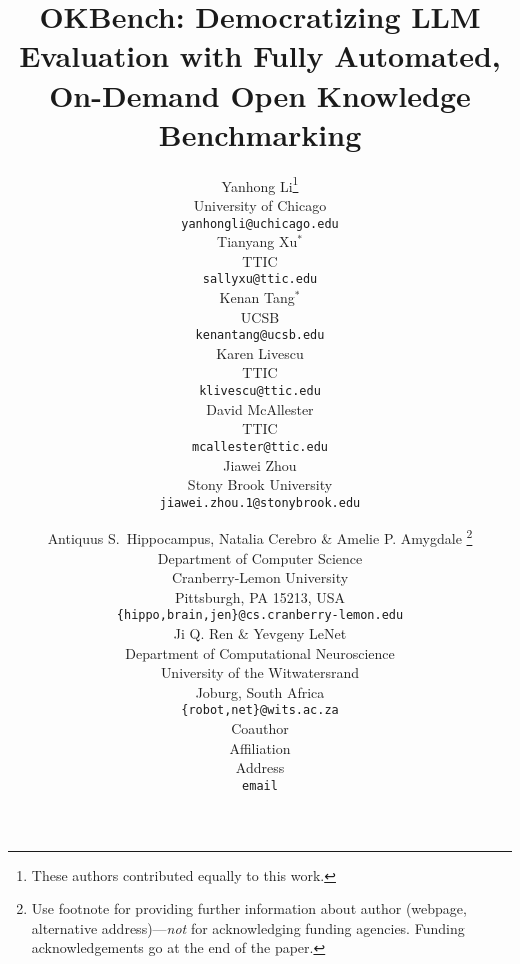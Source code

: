 \documentclass[11pt]{article}
\title{OKBench: Democratizing LLM Evaluation with Fully Automated, On-Demand Open Knowledge Benchmarking}
\author{Yanhong Li\thanks{These authors contributed equally to this work.} \\
  University of Chicago \\
  \texttt{yanhongli@uchicago.edu}\\\And
  Tianyang Xu$^{*}$ \\
  TTIC \\
  \texttt{sallyxu@ttic.edu} \\\And
  Kenan Tang$^{*}$ \\
  UCSB \\
  \texttt{kenantang@ucsb.edu} \\
  \AND
  Karen Livescu \\
  TTIC \\
  \texttt{klivescu@ttic.edu} \\
  \And
  David McAllester \\
  TTIC \\
\texttt{mcallester@ttic.edu} \\
  \And
  Jiawei Zhou \\
  Stony Brook University \\
\texttt{jiawei.zhou.1@stonybrook.edu}
  }
\begin{document}
\maketitle




\author{Antiquus S.~Hippocampus, Natalia Cerebro \& Amelie P. Amygdale \thanks{ Use footnote for providing further information
about author (webpage, alternative address)---\emph{not} for acknowledging
funding agencies.  Funding acknowledgements go at the end of the paper.} \\
Department of Computer Science\\
Cranberry-Lemon University\\
Pittsburgh, PA 15213, USA \\
\texttt{\{hippo,brain,jen\}@cs.cranberry-lemon.edu} \\
\And
Ji Q. Ren \& Yevgeny LeNet \\
Department of Computational Neuroscience \\
University of the Witwatersrand \\
Joburg, South Africa \\
\texttt{\{robot,net\}@wits.ac.za} \\
\AND
Coauthor \\
Affiliation \\
Address \\
\texttt{email}
}

%




\maketitle
\end{document}
